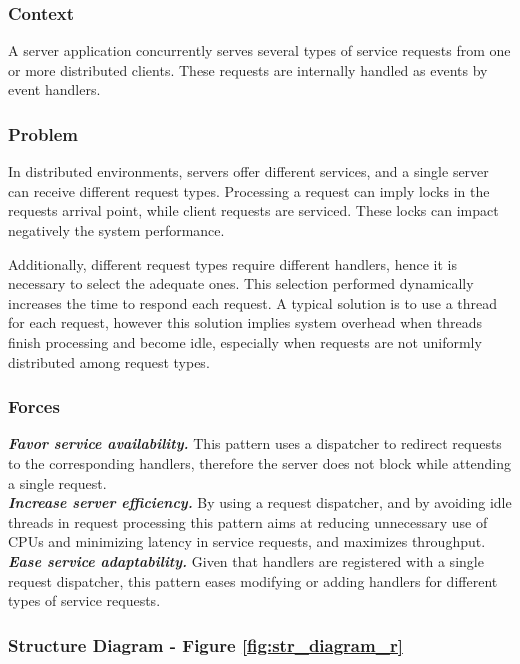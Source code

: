 \subsubsection{Context}
A server application concurrently serves several types of service requests from one or more distributed clients. These requests are internally handled as events by event handlers.


\subsubsection{Problem}
In distributed environments, servers offer different services, and a single server can receive different request types. Processing a request can imply locks in the requests arrival point, while client requests are serviced. These locks can impact negatively the system performance.

Additionally, different request types require different handlers, hence it is necessary to select the adequate ones. This selection performed dynamically increases the time to respond each request. A typical solution is to use a thread for each request, however this solution implies system overhead when threads finish processing and become idle, especially when requests are not uniformly distributed among request types.


\subsubsection{Forces}
\textbf{\textit{Favor service availability. }}This pattern uses a dispatcher to redirect requests to the corresponding handlers, therefore the server does not block while attending a single request. \\

\noindent\textbf{\textit{Increase server efficiency.}} By using a request dispatcher, and by avoiding idle threads in request processing this pattern aims at reducing unnecessary use of CPUs and minimizing latency in service requests, and maximizes throughput.\\

\noindent\textbf{\textit{Ease service adaptability.}} Given that handlers are registered with a single request dispatcher, this pattern eases modifying or adding handlers for different types of service requests.

\subsubsection{Structure Diagram - Figure \ref{fig:str_diagram_r}}

